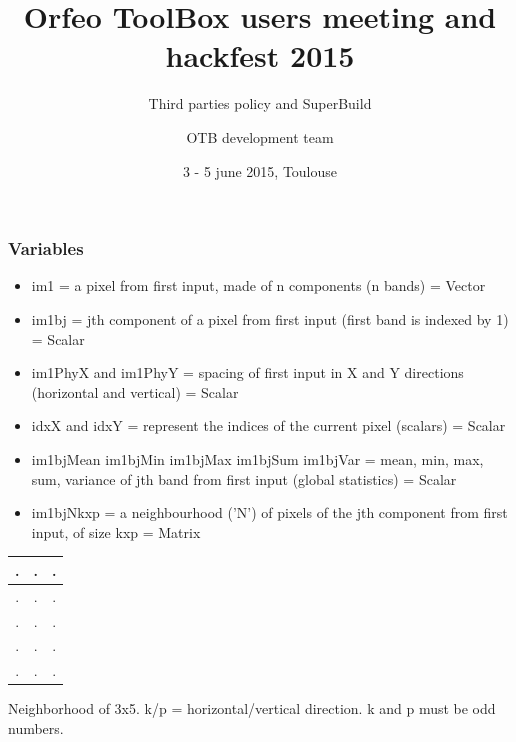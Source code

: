 \documentclass[8pt]{beamer}
\title{Orfeo ToolBox users meeting and hackfest 2015}
\subtitle{Third parties policy and SuperBuild}
\author{OTB development team}%
\date{3 - 5 june 2015, Toulouse}
\begin{document}
\begin{frame}
\titlepage
\end{frame}

\begin{frame}
\frametitle{Variables}

\begin{itemize}
\item im1 =  a pixel from first input, made of n components (n bands) = Vector
\item im1bj = jth component of a pixel from first input (first band is indexed by 1) = Scalar
\item im1PhyX and im1PhyY = spacing of first input in X and Y directions (horizontal and vertical) = Scalar 
\item idxX and idxY = represent the indices of the current pixel (scalars) = Scalar
\item im1bjMean  im1bjMin  im1bjMax  im1bjSum  im1bjVar  = mean,  min,  max,  sum,  variance  of  jth band from first input (global statistics) = Scalar
\item im1bjNkxp = a neighbourhood (’N’) of pixels of the jth component from first input, of size kxp = Matrix 
\end{itemize}

\begin{center} 
\begin{tabular}{|c|c|c|}
\hline
.	& .	& . \\
\hline
.	& .	& . \\
\hline
.	& .	& . \\
\hline
.	& .	& . \\
\hline
.	& .	& . \\
\hline
\end{tabular}
\end{center}
\begin{center} 
\caption{Neighborhood of 3x5. k/p = horizontal/vertical direction. k and p must be odd numbers.}
\end{center}

\end{frame}
\end{document}

